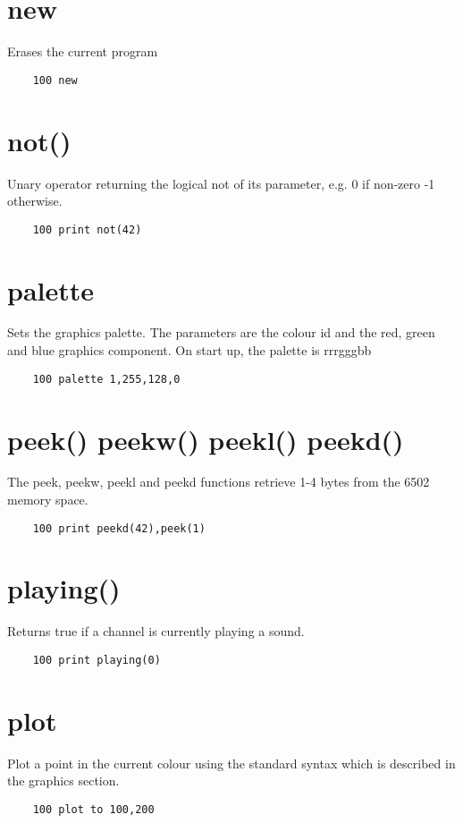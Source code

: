 \section*{new}
Erases the current program
\example{}
\begin{verbatim}
	100 new
\end{verbatim}

\section*{not()}
Unary operator returning the logical not of its parameter, e.g. 0 if non-zero -1 otherwise.
\example{}
\begin{verbatim}
	100 print not(42)
\end{verbatim}

\section*{palette}
Sets the graphics palette. The parameters are the colour id and the red, green and blue graphics component. On start up, the palette is rrrgggbb
\example{}
\begin{verbatim}
	100 palette 1,255,128,0
\end{verbatim}

\section*{peek() peekw() peekl() peekd() }
The peek, peekw, peekl and peekd functions retrieve 1-4 bytes from the 6502 memory space.
\example{}
\begin{verbatim}
	100 print peekd(42),peek(1)
\end{verbatim}

\section*{playing()}
Returns true if a channel is currently playing a sound.
\example{}
\begin{verbatim}
	100 print playing(0)
\end{verbatim}

\section*{plot}
Plot a point in the current colour using the standard syntax which is described in the graphics section.
\example{}
\begin{verbatim}
	100 plot to 100,200
\end{verbatim}

